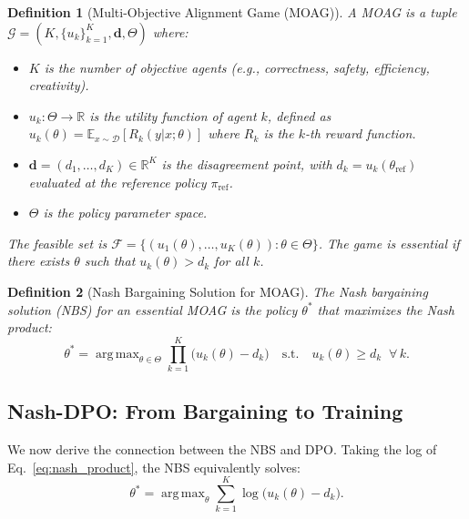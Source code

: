 \documentclass{article}
\newtheorem{definition}{Definition}
\DeclareMathOperator*{\argmax}{arg\,max}
\newcommand{\piref}{\pi_{\text{ref}}}
\newcommand{\RR}{\mathbb{R}}
\newcommand{\EE}{\mathbb{E}}
\begin{document}
\begin{definition}[Multi-Objective Alignment Game (MOAG)]
\label{def:moag}
A MOAG is a tuple $\mathcal{G} = (K, \{u_k\}_{k=1}^K, \mathbf{d}, \Theta)$ where:
\begin{itemize}
    \item $K$ is the number of objective agents (e.g., correctness, safety, efficiency, creativity).
    \item $u_k : \Theta \to \RR$ is the utility function of agent $k$, defined as $u_k(\theta) = \EE_{x \sim \mathcal{D}}[R_k(y | x; \theta)]$ where $R_k$ is the $k$-th reward function.
    \item $\mathbf{d} = (d_1, \ldots, d_K) \in \RR^K$ is the \emph{disagreement point}, with $d_k = u_k(\theta_{\text{ref}})$ evaluated at the reference policy $\piref$.
    \item $\Theta$ is the policy parameter space.
\end{itemize}
The \emph{feasible set} is $\mathcal{F} = \{(u_1(\theta), \ldots, u_K(\theta)) : \theta \in \Theta\}$.
The game is \emph{essential} if there exists $\theta$ such that $u_k(\theta) > d_k$ for all $k$.
\end{definition}

\begin{definition}[Nash Bargaining Solution for MOAG]
\label{def:nbs}
The Nash bargaining solution (NBS) for an essential MOAG is the policy $\theta^*$ that maximizes the Nash product:
\begin{equation}
\theta^* = \argmax_{\theta \in \Theta} \prod_{k=1}^K \bigl(u_k(\theta) - d_k\bigr) \quad \text{s.t.} \quad u_k(\theta) \geq d_k \;\;\forall\, k.
\label{eq:nash_product}
\end{equation}
\end{definition}

\subsection{Nash-DPO: From Bargaining to Training}

We now derive the connection between the NBS and DPO.
Taking the log of Eq.~\eqref{eq:nash_product}, the NBS equivalently solves:
\begin{equation}
\theta^* = \argmax_{\theta} \sum_{k=1}^K \log\bigl(u_k(\theta) - d_k\bigr).
\label{eq:log_nash}
\end{equation}
\end{document}
